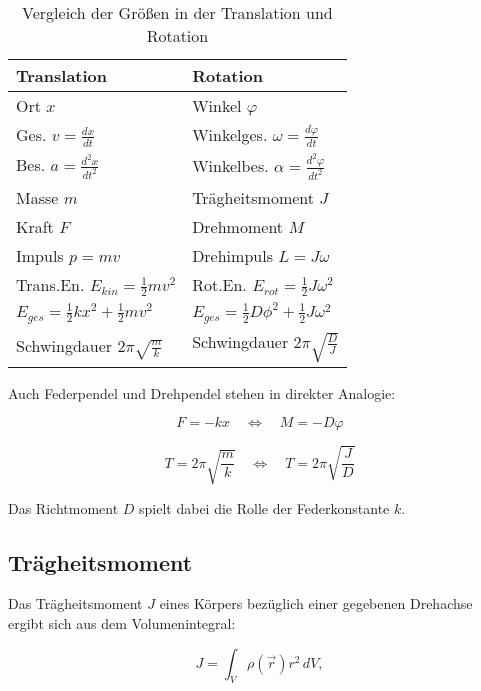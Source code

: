 \begin{table}[h!]
\renewcommand{\arraystretch}{1.75} %
\centering
\begin{tabular}{l|l}
    \textbf{Translation} & \textbf{Rotation} \\
    \hline
    Ort $x$ & Winkel $\varphi$ \\
    Ges. $v = \tfrac{dx}{dt}$ & Winkelges. $\omega = \tfrac{d\varphi}{dt}$ \\
    Bes. $a = \tfrac{d^2x}{dt^2}$ & Winkelbes. $\alpha = \tfrac{d^2\varphi}{dt^2}$ \\
    Masse $m$ & Trägheitsmoment $J$ \\
    Kraft $F$ & Drehmoment $M$ \\
    Impuls $p = mv$ & Drehimpuls $L = J\omega$ \\
    Trans.En. $E_{kin} = \tfrac{1}{2}mv^2$ & Rot.En. $E_{rot} = \tfrac{1}{2}J\omega^2$ \\
    $E_{ges} = \frac{1}{2}kx^2 + \frac{1}{2} mv^2$ & $E_{ges} = \frac{1}{2}D\phi^2 + \frac{1}{2} J \omega^2$ \\
    Schwingdauer $2\pi \sqrt{\frac{m}{k}}$ & Schwingdauer $2 \pi \sqrt{\frac{D}{J}}$
\end{tabular}
\caption{Vergleich der Größen in der Translation und Rotation}
\label{tab:translation-rotation}
\end{table}

\vspace{0.25cm}

Auch Federpendel und Drehpendel stehen in direkter Analogie:

\begin{equation}
    F = -kx \quad \Leftrightarrow \quad M = -D\varphi
    \label{eq:kraft_drehmoment_zusammenhang}
\end{equation}

\begin{equation}
T = 2\pi\sqrt{\frac{m}{k}} \quad \Leftrightarrow \quad T = 2\pi\sqrt{\frac{J}{D}}
\end{equation}

Das Richtmoment $D$ spielt dabei die Rolle der Federkonstante $k$.

\subsection*{Trägheitsmoment}
Das Trägheitsmoment $J$ eines Körpers bezüglich einer gegebenen Drehachse ergibt sich aus dem Volumenintegral:

\begin{equation}
    J = \int_V \rho(\vec{r}) r^2 \, dV,
\end{equation}

